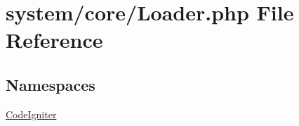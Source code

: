 \hypertarget{_loader_8php}{}\section{system/core/\+Loader.php File Reference}
\label{_loader_8php}
\subsection*{Namespaces}
\begin{DoxyCompactItemize}
\item 
 \mbox{\hyperlink{namespace_code_igniter}{Code\+Igniter}}
\end{DoxyCompactItemize}
